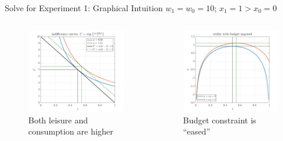 \documentclass[11pt,aspectratio=43]{beamer}
\theoremstyle{definition}
\begin{document}
\begin{frame}{Solve for Experiment 1: Graphical Intuition}
\label{slide:Solve_for_Experiment_1__Graphical_Intuition}
    $ w_{1} = w_{0} = 10 $; $ x_{1} = 1 > x_{0} = 0 $
    \begin{columns}
        \begin{column}{0.5\textwidth}
            \begin{figure}
                \caption{Both leisure and consumption are higher}
                \includegraphics[width=\textwidth]{./figures/Experiment1IC.png}
            \end{figure}
        \end{column}
        \begin{column}{0.5\textwidth}
            \begin{figure}
                \caption{Budget constraint is ``\alert{eased}''}
                \includegraphics[width=\textwidth]{./figures/Experiment1Utility.png}
            \end{figure}
        \end{column}
    \end{columns}
\end{frame}
\end{document}
